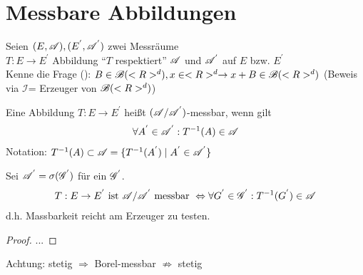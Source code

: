 \section{Messbare Abbildungen}

Seien $(E, \mathscr{A}), (E^{'}, \mathscr{A}^{'})$ zwei Messräume\\
$T: E \to E^{'}$ Abbildung ``$T$ respektiert'' $\mathscr{A}$ und $\mathscr{A}^{'}$ auf $E$ bzw. $E^{'}$\\
Kenne die Frage (): $B \in \mathscr{B} (<R>^d), x \in <R>^d \to x + B \in \mathscr{B} (<R>^d)$ (Beweis via $\mathscr{I}$= Erzeuger von $\mathscr{B} (<R>^d)$)

\begin{definition}
	Eine Abbildung $T: E \to E^{'}$ heißt $(\mathscr{A} / \mathscr{A}^{'})$-messbar, wenn gilt
	\begin{align}
		\forall A^{'} \in \mathscr{A}^{'}: T^{-1}(A) \in \mathscr{A}
	\end{align}
	Notation: $T^{-1}(A) \subset \mathscr{A} = \{T^{-1}(A^{'}) \mid A^{'} \in \mathscr{A}^{'}\}$
\end{definition}


\begin{lemma}
	Sei $\mathscr{A}^{'} = \sigma(\mathscr{G}^{'})$ für ein $\mathscr{G}^{'}$.
	\begin{align}
		T: E \to E^{'} \text{ ist } \mathscr{A} / \mathscr{A}^{'} \text{ messbar } \Leftrightarrow \forall G^{'} \in \mathscr{G}^{'}: T^{-1}(G^{'}) \in \mathscr{A}
	\end{align}
	d.h. Massbarkeit reicht am Erzeuger zu testen.
\end{lemma}

\begin{proof}
	...
\end{proof}

\begin{example}
	Jede stetige Abbildung $T: \Rd \to \Rd$ ist Borel-$(\sigB (\Rd) / \sigB (\Rn))$ - messbar\\
	Grund: $\sigB(\Rd) = \sigma(\sigO)$, $\sigO^n :=\{\text{offene Mengen }\subseteq \Rn\\}$
	\begin{align}
		f \text{ stetig } \Rightarrow f^{-1}(\sigO^n) \subset \sigO^d \subset \sigB (\Rd) \text{ und } \propref{6_2}
	\end{align}
\end{example}

Achtung: stetig $\Rightarrow$ Borel-messbar $\not \Rightarrow$ stetig\\

